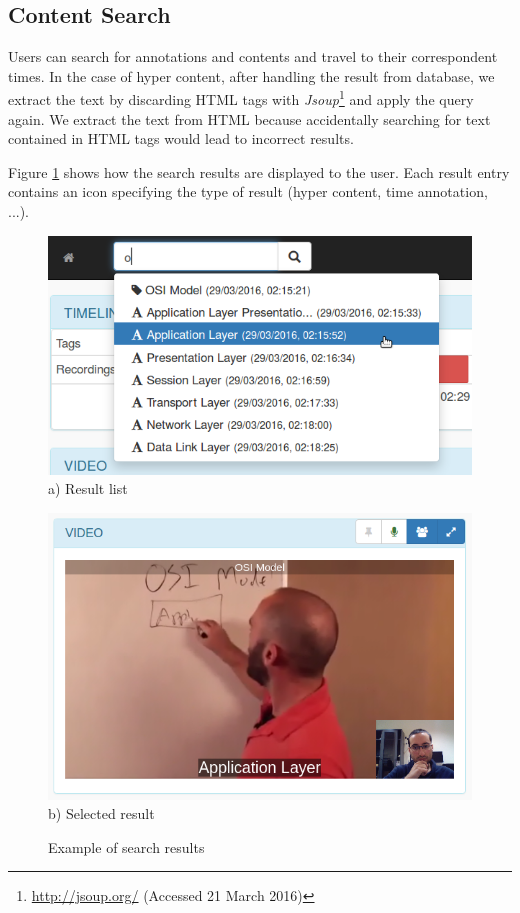 	\subsection{Content Search}

	Users can search for annotations and contents and travel to their correspondent times. In the case of hyper content, after handling the result from database, we extract the text by discarding \ac{HTML} tags with \emph{Jsoup}\footnote{\url{http://jsoup.org/} (Accessed 21 March 2016)} and apply the query again. We extract the text from \ac{HTML} because accidentally searching for text contained in \ac{HTML} tags would lead to incorrect results.

	Figure \ref{fig:search} shows how the search results are displayed to the user. Each result entry contains an icon specifying the type of result (hyper content, time annotation, ...).




\begin{figure}
	\centering
	\begin{minipage}[b]{0.55\linewidth}
		\centering
		\includegraphics[width=\textwidth]{figures/search.png}
		a) Result list
	\end{minipage}
	\quad
	\begin{minipage}[b]{0.40\linewidth}
		\centering
		\includegraphics[width=\textwidth]{figures/search2.png}
	    b) Selected result
	\end{minipage}
	\caption{Example of search results}
	\label{fig:search}
\end{figure}



